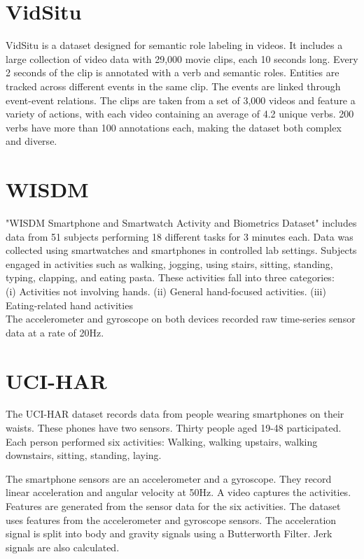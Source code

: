 \section{VidSitu}
VidSitu \parencite{VidSitu}  is a dataset designed for semantic role labeling in videos. It includes a large collection of video data with 29,000 movie clips, each 10 seconds long. Every 2 seconds of the clip is annotated with a verb and semantic roles. Entities are tracked across different events in the same clip. The events are linked through event-event relations. The clips are taken from a set of 3,000 videos and feature a variety of actions, with each video containing an average of 4.2 unique verbs.  200 verbs have more than 100 annotations each, making the dataset both complex and diverse.

\section{WISDM}
\cite{WISDM} "WISDM Smartphone and Smartwatch Activity and Biometrics Dataset" includes data from 51 subjects performing 18 different tasks for 3 minutes each. Data was collected using smartwatches and smartphones in controlled lab settings. Subjects engaged in activities such as walking, jogging, using stairs, sitting, standing, typing, clapping, and eating pasta. These activities fall into three categories: \\
(i) Activities not involving hands. (ii) General hand-focused activities. (iii) Eating-related hand activities\\
The accelerometer and gyroscope on both devices recorded raw time-series sensor data at a rate of 20Hz.  

\section{UCI-HAR}
The UCI-HAR \parencite{UCI-HAR} dataset records data from people wearing smartphones on their waists. These phones have two sensors. Thirty people aged 19-48 participated. Each person performed six activities: Walking, walking upstairs, walking downstairs, sitting, standing, laying.

The smartphone sensors are an accelerometer and a gyroscope. They record linear acceleration and angular velocity at 50Hz. A video captures the activities. Features are generated from the sensor data for the six activities. The dataset uses features from the accelerometer and gyroscope sensors. The acceleration signal is split into body and gravity signals using a Butterworth Filter. Jerk signals are also calculated.


